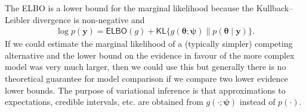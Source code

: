 \documentclass[
  11pt,
  letterpaper,
]{scrbook}
\theoremstyle{plain}
\theoremstyle{plain}
\theoremstyle{definition}
\theoremstyle{definition}
\theoremstyle{definition}
\theoremstyle{plain}
\theoremstyle{remark}
\begin{document}
The ELBO is a lower bound for the marginal likelihood because the
Kullback--Leibler divergence is non-negative and \begin{align*}
\log p(\boldsymbol{y}) = \mathsf{ELBO}(g) +  \mathsf{KL}\{g(\boldsymbol{\theta};\boldsymbol{\psi}) \parallel p(\boldsymbol{\theta} \mid \boldsymbol{y})\}.
\end{align*} If we could estimate the marginal likelihood of a
(typically simpler) competing alternative and the lower bound on the
evidence in favour of the more complex model was very much larger, then
we could use this but generally there is no theoretical guarantee for
model comparison if we compare two lower evidence lower bounds. The
purpose of variational inference is that approximations to expectations,
credible intervals, etc. are obtained from
\(g(\cdot; \boldsymbol{\psi})\) instead of \(p(\cdot).\)
\end{document}
